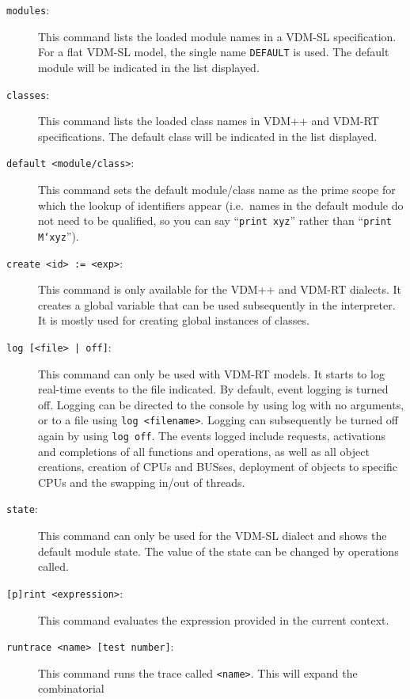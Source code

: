 \documentclass{overturerepchap}
\begin{document}
\begin{description}
\item[\texttt{modules}:] This command lists the loaded module names in
  a VDM-SL specification. For a flat VDM-SL model, the single name
  \texttt{DEFAULT} is used. The default module will be indicated in
  the list displayed.
\item[\texttt{classes}:] This command lists the loaded class names in
  VDM++ and VDM-RT specifications. The default class will be indicated in
  the list displayed.
\item[\texttt{default <module/class>}:] This command sets the default
  module/class name as the prime scope for which the lookup of
  identifiers appear (i.e.\ names in the default module
  do not need to be qualified, so you can say ``\texttt{print xyz}'' rather than
``\texttt{print M`xyz}'').
\item[\texttt{create <id> := <exp>}:] This command is only available
  for the VDM++ and VDM-RT dialects. It creates a global variable that
  can be used subsequently in the interpreter. It is mostly used for
  creating global instances of classes. 
\item[\texttt{log [<file> | off]}:] This command can only be used with
  VDM-RT models. It starts to log real-time events to the file indicated. By
  default, event logging is turned off. Logging can be directed to
  the console by using log with no arguments, or to a file using \texttt{log
  <filename>}. Logging can subsequently be turned off again by using
  \texttt{log off}. The events logged include requests, activations and
  completions of all functions and operations, as well as all object creations,
  creation of CPUs and BUSses, deployment of objects
  to specific CPUs and the swapping in/out of threads.  
\item[\texttt{state}:] This command can only be used for the VDM-SL
  dialect and shows the default module state.  
  The value of the state can be changed by operations called.
\item[\texttt{[p]rint <expression>}:] This command evaluates the
  expression provided in the current context.     
\item[\texttt{runtrace <name> [test number]}:] This command runs the trace called
  \texttt{<name>}. This will expand the combinatorial

\end{description}
\end{document}

